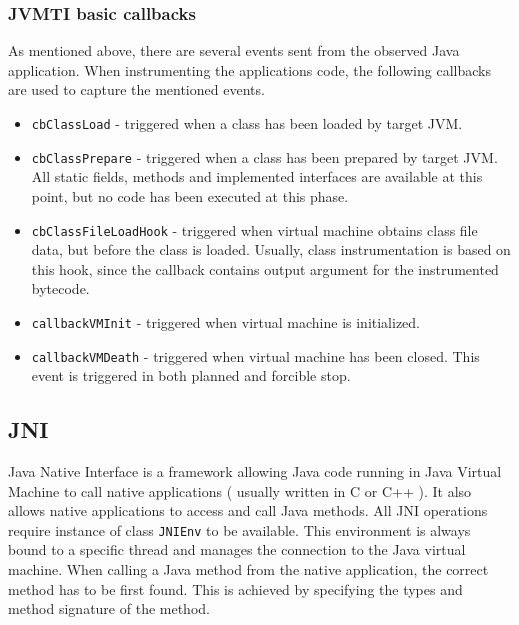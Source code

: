 \subsubsection{JVMTI basic callbacks}
As mentioned above, there are several events sent from the observed Java application. When instrumenting the applications code, the following callbacks are used to capture the mentioned events.
\begin{itemize}
	\item \texttt{cbClassLoad} - triggered when a class has been loaded by target JVM.
	\item \texttt{cbClassPrepare} - triggered when a class has been prepared by target JVM. All static fields, methods and implemented interfaces are available at this point, but no code has been executed at this phase.
	\item \texttt{cbClassFileLoadHook} - triggered when virtual machine obtains class file data, but before the class is loaded. Usually, class instrumentation is based on this hook, since the callback contains output argument for the instrumented bytecode.
	\item  \texttt{callbackVMInit} - triggered when virtual machine is initialized.
	\item  \texttt{callbackVMDeath} - triggered when virtual machine has been closed. This event is triggered in both planned and forcible stop.
\end{itemize}

\subsection{JNI}
\label{JNI}
Java Native Interface is a framework allowing Java code running in Java Virtual Machine to call native applications ( usually written in C or C++ ). It also allows native applications to access and call Java methods. All JNI operations require instance of class \texttt{JNIEnv} to be available. This environment is always bound to a specific thread and manages the connection to the Java virtual machine. When calling a Java method from the native application, the correct method has to be first found. This is achieved by specifying the types and method signature of the method.
